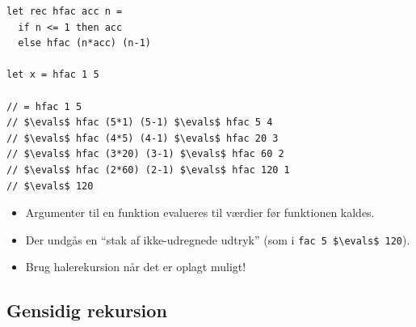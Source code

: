 \documentclass[rgb]{beamer}
\begin{document}
\begin{frame}[fragile]
\begin{footnotesize}


\begin{lstlisting}[numbers=none,frame=none,mathescape]
let rec hfac acc n =
  if n <= 1 then acc
  else hfac (n*acc) (n-1)

let x = hfac 1 5

// = hfac 1 5
// $\evals$ hfac (5*1) (5-1) $\evals$ hfac 5 4
// $\evals$ hfac (4*5) (4-1) $\evals$ hfac 20 3
// $\evals$ hfac (3*20) (3-1) $\evals$ hfac 60 2
// $\evals$ hfac (2*60) (2-1) $\evals$ hfac 120 1
// $\evals$ 120
\end{lstlisting}


\begin{itemize}
\item Argumenter til en funktion evalueres til værdier før funktionen kaldes.
\item Der undgås en ``stak af ikke-udregnede udtryk'' (som i \lstinline[mathescape]{fac 5 $\evals$ 120}).
\item Brug halerekursion når det er oplagt muligt!
\end{itemize}

\end{footnotesize}
\end{frame}

\subsection{Gensidig rekursion}
\end{document}
